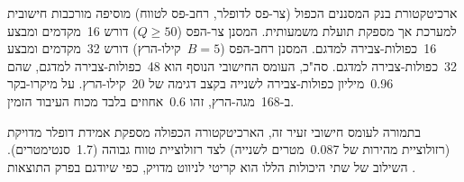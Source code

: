 ארכיטקטורת בנק המסננים הכפול (צר-פס לדופלר, רחב-פס לטווח) מוסיפה מורכבות חישובית למערכת אך מספקת תועלת משמעותית. המסנן צר-הפס ($Q \geq 50$) דורש 16~מקדמים ומבצע 16~כפולות-צבירה למדגם. המסנן רחב-הפס ($B = 5$~קילו-הרץ) דורש 32~מקדמים ומבצע 32~כפולות-צבירה למדגם. סה"כ, העומס החישובי הנוסף הוא 48~כפולות-צבירה למדגם, שהם 0.96~מיליון כפולות-צבירה לשנייה בקצב דגימה של 20~קילו-הרץ. על מיקרו-בקר  ב-168~מגה-הרץ, זהו 0.6~אחוזים בלבד מכוח העיבוד הזמין.

בתמורה לעומס חישובי זעיר זה, הארכיטקטורה הכפולה מספקת אמידת דופלר מדויקת (רזולוציית מהירות של 0.087~מטרים לשנייה) לצד רזולוציית טווח גבוהה (1.7~סנטימטרים). השילוב של שתי היכולות הללו הוא קריטי לניווט מדויק, כפי שיודגם בפרק התוצאות \cite{Chen2020BioSonar, Horiuchi2005Neuromorphic, CrewAIDocs}.